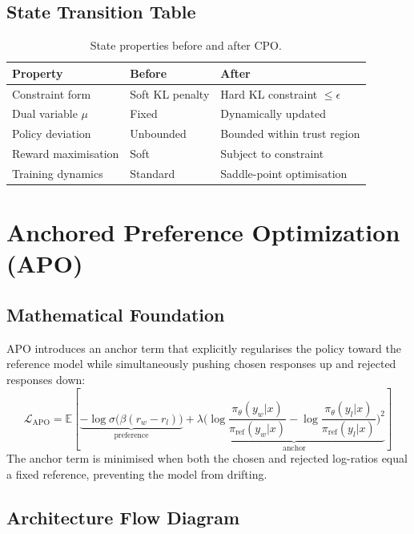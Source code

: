 \subsection{State Transition Table}
\begin{table}[h]\centering
\begin{tabular}{lll}\toprule
\textbf{Property} & \textbf{Before} & \textbf{After}\\\midrule
Constraint form & Soft KL penalty & Hard KL constraint $\leq \epsilon$\\
Dual variable $\mu$ & Fixed & Dynamically updated\\
Policy deviation & Unbounded & Bounded within trust region\\
Reward maximisation & Soft & Subject to constraint\\
Training dynamics & Standard & Saddle-point optimisation\\\bottomrule
\end{tabular}
\caption{State properties before and after CPO.}
\end{table}

\newpage
\section{Anchored Preference Optimization (APO)}

\subsection{Mathematical Foundation}
APO introduces an anchor term that explicitly regularises the policy toward the reference model while simultaneously pushing chosen responses up and rejected responses down:
\begin{equation}
  \mathcal{L}_{\text{APO}} = \mathbb{E}\!\left[\underbrace{-\log\sigma\bigl(\beta(r_w - r_l)\bigr)}_{\text{preference}} + \lambda\underbrace{\bigl(\log\frac{\pi_\theta(y_w|x)}{\pi_{\text{ref}}(y_w|x)} - \log\frac{\pi_\theta(y_l|x)}{\pi_{\text{ref}}(y_l|x)}\bigr)^2}_{\text{anchor}}\right]
\end{equation}
The anchor term is minimised when both the chosen and rejected log-ratios equal a fixed reference, preventing the model from drifting.

\subsection{Architecture Flow Diagram}

